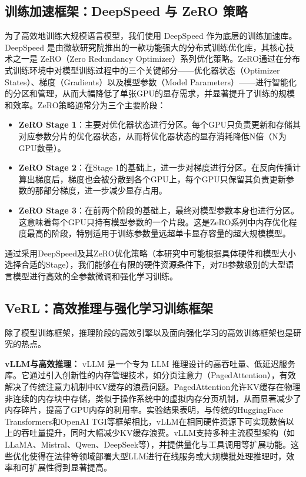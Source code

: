 \documentclass{pkuthesis}
\begin{document}
\subsection{训练加速框架：DeepSpeed 与 ZeRO 策略}
为了高效地训练大规模语言模型，我们使用 DeepSpeed 作为底层的训练加速库。DeepSpeed 是由微软研究院推出的一款功能强大的分布式训练优化库，其核心技术之一是 ZeRO（Zero Redundancy Optimizer）系列优化策略。ZeRO通过在分布式训练环境中对模型训练过程中的三个关键部分——优化器状态（Optimizer States）、梯度（Gradients）以及模型参数（Model Parameters）——进行智能化的分区和管理，从而大幅降低了单张GPU的显存需求，并显著提升了训练的规模和效率。ZeRO策略通常分为三个主要阶段：
\begin{itemize}
\item \textbf{ZeRO Stage 1}：主要对优化器状态进行分区。每个GPU只负责更新和存储其对应参数分片的优化器状态，从而将优化器状态的显存消耗降低N倍（N为GPU数量）。
\item \textbf{ZeRO Stage 2}：在Stage 1的基础上，进一步对梯度进行分区。在反向传播计算出梯度后，梯度也会被分散到各个GPU上，每个GPU只保留其负责更新参数的那部分梯度，进一步减少显存占用。
\item \textbf{ZeRO Stage 3}：在前两个阶段的基础上，最终对模型参数本身也进行分区。这意味着每个GPU只持有模型参数的一个片段。这是ZeRO系列中内存优化程度最高的阶段，特别适用于训练参数量远超单卡显存容量的超大规模模型。
\end{itemize}
通过采用DeepSpeed及其ZeRO优化策略（本研究中可能根据具体硬件和模型大小选择合适的Stage），我们能够在有限的硬件资源条件下，对7B参数级别的大型语言模型进行高效的全参数微调和强化学习训练。

\subsection{VeRL：高效推理与强化学习训练框架}
除了模型训练框架，推理阶段的高效引擎以及面向强化学习的高效训练框架也是研究的热点。

\textbf{vLLM与高效推理：} vLLM 是一个专为 LLM 推理设计的高吞吐量、低延迟服务库。它通过引入创新性的内存管理技术，如分页注意力（PagedAttention），有效解决了传统注意力机制中KV缓存的浪费问题。PagedAttention允许KV缓存在物理非连续的内存块中存储，类似于操作系统中的虚拟内存分页机制，从而显著减少了内存碎片，提高了GPU内存的利用率。实验结果表明，与传统的HuggingFace Transformers和OpenAI TGI等框架相比，vLLM在相同硬件资源下可实现数倍以上的吞吐量提升，同时大幅减少KV缓存浪费。vLLM支持多种主流模型架构（如LLaMA、Mistral、Qwen、DeepSeek等），并提供量化与工具调用等扩展功能。这些优化使得在法律等领域部署大型LLM进行在线服务或大规模批处理推理时，效率和可扩展性得到显著提高。
\end{document}
